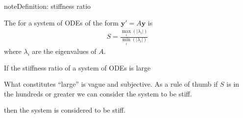 \documentclass[letterpaper,10pt,english]{jupyterBook}
\begin{document}
\begin{sphinxadmonition}{note}{Definition: stiffness ratio}

\sphinxAtStartPar
The  for a system of ODEs of the form \(\mathbf{y}' = A \mathbf{y}\) is
\begin{equation*}
\begin{split}S = \frac{\max_i(|\lambda_i|)}{\min_i(|\lambda_i|)}\end{split}
\end{equation*}
\sphinxAtStartPar
where \(\lambda_i\) are the eigenvalues of \(A\).
\end{sphinxadmonition}

\sphinxAtStartPar
If the stiffness ratio of a system of ODEs is large%
\begin{footnote}[1]\sphinxAtStartFootnote
What constitutes “large” is vague and subjective. As a rule of thumb if \(S\) is in the hundreds or greater we can consider the system to be stiff.
%
\end{footnote} then the system is considered to be stiff.
\end{document}
